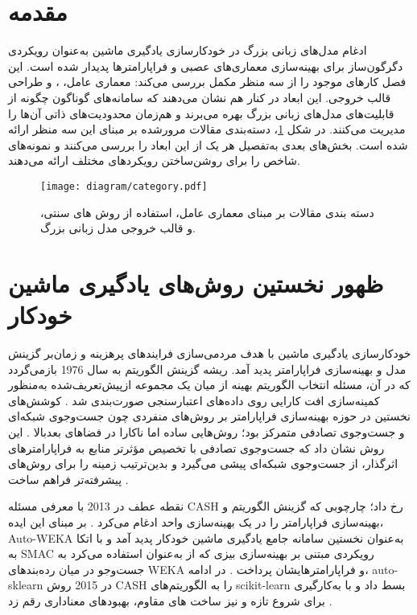 \section{مقدمه}
ادغام مدل‌های زبانی بزرگ در خودکارسازی یادگیری ماشین به‌عنوان رویکردی دگرگون‌ساز برای بهینه‌سازی معماری‌های عصبی و فراپارامترها پدیدار شده است. این فصل کارهای موجود را از سه منظر مکمل بررسی می‌کند: معماری عامل، ، و طراحی قالب خروجی. این ابعاد در کنار هم نشان می‌دهند که سامانه‌های گوناگون چگونه از قابلیت‌های مدل‌های زبانی بزرگ بهره می‌برند و هم‌زمان محدودیت‌های ذاتی آن‌ها را مدیریت می‌کنند.
در شکل \ref{fig:category}، دسته‌بندی مقالات مرورشده بر مبنای این سه منظر ارائه شده است. بخش‌های بعدی به‌تفصیل هر یک از این ابعاد را بررسی می‌کنند و نمونه‌های شاخص را برای روشن‌ساختن رویکردهای مختلف ارائه می‌دهند.
\begin{figure}[h!]
    \centering
    \texttt{[image: diagram/category.pdf]}
    \caption[دسته بندی مقالات]{
        دسته بندی مقالات بر مبنای معماری عامل، استفاده از روش های سنتی، و قالب خروجی مدل زبانی بزرگ.
    }
    \label{fig:category}

\end{figure}
\section{ظهور نخستین روش‌های یادگیری ماشین خودکار}
خودکارسازی یادگیری ماشین با هدف مردمی‌سازی فرایندهای پرهزینه و زمان‌بر گزینش مدل و بهینه‌سازی فراپارامتر پدید آمد. ریشه گزینش الگوریتم به سال 1976 بازمی‌گردد که در آن، مسئله انتخاب الگوریتم بهینه از میان یک مجموعه ازپیش‌تعریف‌شده به‌منظور کمینه‌سازی افت کارایی روی داده‌های اعتبارسنجی صورت‌بندی شد \cite{RICE197665}. کوشش‌های نخستین در حوزه بهینه‌سازی فراپارامتر بر روش‌های منفردی چون جست‌وجوی شبکه‌ای و جست‌وجوی تصادفی متمرکز بود؛ روش‌هایی ساده اما ناکارا در فضاهای بعدبالا \cite{JMLR:v13:bergstra12a}. این روش نشان داد که جست‌وجوی تصادفی با تخصیص مؤثرتر منابع به فراپارامترهای اثرگذار، از جست‌وجوی شبکه‌ای پیشی می‌گیرد و بدین‌ترتیب زمینه را برای روش‌های پیشرفته‌تر فراهم ساخت \cite{JMLR:v13:bergstra12a}.

نقطه عطف در 2013 با معرفی مسئله CASH رخ داد؛ چارچوبی که گزینش الگوریتم و بهینه‌سازی فراپارامتر را در یک بهینه‌سازی واحد ادغام می‌کرد \cite{10.1145/2487575.2487629}. بر مبنای این ایده، Auto-WEKA به‌عنوان نخستین سامانه جامع یادگیری ماشین خودکار پدید آمد و با اتکا به SMAC   رویکردی مبتنی بر بهینه‌سازی بیزی که از  به‌عنوان  استفاده می‌کرد   به جست‌وجو در میان رده‌بندهای WEKA و فراپارامترهایشان پرداخت \cite{10.1145/2487575.2487629, 10.1007/978-3-642-25566-3_40}. در ادامه، auto-sklearn در 2015 روش CASH را به الگوریتم‌های scikit-learn بسط داد و با به‌کارگیری  برای شروع تازه و نیز ساخت ‌های مقاوم، بهبودهای معناداری رقم زد \cite{NIPS2015_11d0e628}.

